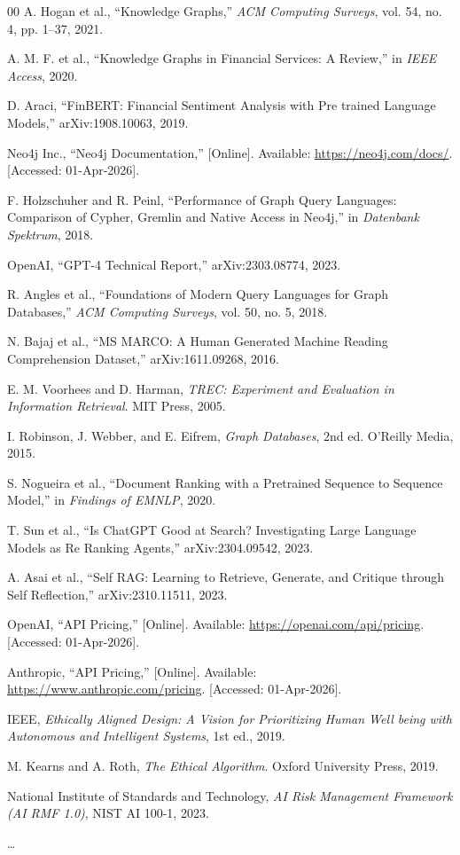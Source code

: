 \documentclass[conference]{IEEEtran}
\begin{document}
\begin{thebibliography}{00}
A. Hogan et al., ``Knowledge Graphs,'' \textit{ACM Computing Surveys}, vol. 54, no. 4, pp. 1--37, 2021.

A. M. F. et al., ``Knowledge Graphs in Financial Services: A Review,'' in \textit{IEEE Access}, 2020.

D. Araci, ``FinBERT: Financial Sentiment Analysis with Pre trained Language Models,'' arXiv:1908.10063, 2019.

Neo4j Inc., ``Neo4j Documentation,'' [Online]. Available: \url{https://neo4j.com/docs/}. [Accessed: 01-Apr-2026].

F. Holzschuher and R. Peinl, ``Performance of Graph Query Languages: Comparison of Cypher, Gremlin and Native Access in Neo4j,'' in \textit{Datenbank Spektrum}, 2018.

OpenAI, ``GPT-4 Technical Report,'' arXiv:2303.08774, 2023.

R. Angles et al., ``Foundations of Modern Query Languages for Graph Databases,'' \textit{ACM Computing Surveys}, vol. 50, no. 5, 2018.

N. Bajaj et al., ``MS MARCO: A Human Generated Machine Reading Comprehension Dataset,'' arXiv:1611.09268, 2016.

E. M. Voorhees and D. Harman, \textit{TREC: Experiment and Evaluation in Information Retrieval}. MIT Press, 2005.

I. Robinson, J. Webber, and E. Eifrem, \textit{Graph Databases}, 2nd ed. O'Reilly Media, 2015.

S. Nogueira et al., ``Document Ranking with a Pretrained Sequence to Sequence Model,'' in \textit{Findings of EMNLP}, 2020.

T. Sun et al., ``Is ChatGPT Good at Search? Investigating Large Language Models as Re Ranking Agents,'' arXiv:2304.09542, 2023.

A. Asai et al., ``Self RAG: Learning to Retrieve, Generate, and Critique through Self Reflection,'' arXiv:2310.11511, 2023.

OpenAI, ``API Pricing,'' [Online]. Available: \url{https://openai.com/api/pricing}. [Accessed: 01-Apr-2026].

Anthropic, ``API Pricing,'' [Online]. Available: \url{https://www.anthropic.com/pricing}. [Accessed: 01-Apr-2026].

IEEE, \textit{Ethically Aligned Design: A Vision for Prioritizing Human Well being with Autonomous and Intelligent Systems}, 1st ed., 2019.

M. Kearns and A. Roth, \textit{The Ethical Algorithm}. Oxford University Press, 2019.

National Institute of Standards and Technology, \textit{AI Risk Management Framework (AI RMF 1.0)}, NIST AI 100-1, 2023.

\dots
\end{thebibliography}
\end{document}
